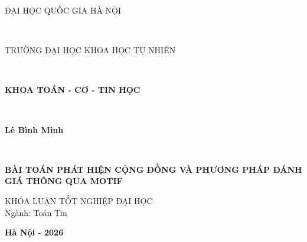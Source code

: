 
\thispagestyle{empty}
\thisfancypage{\fboxrule=8\fboxrule
	\fboxsep=2\fboxsep
\fbox}{}
\begin{center}
\begin{large}
{\fontsize{13pt}{1}\selectfont ĐẠI HỌC QUỐC GIA HÀ NỘI}
\end{large} \\
\begin{large}
{\fontsize{13pt}{1}\selectfont TRƯỜNG ĐẠI HỌC KHOA HỌC TỰ NHIÊN}
\end{large} \\
\begin{large}
{\fontsize{13pt}{1}\selectfont \textbf{KHOA TOÁN - CƠ - TIN HỌC}}
\end{large} \\
\vspace{3 cm}
\begin{large}
{\fontsize{14pt}{1}\selectfont \textbf{Lê Bình Minh}}
\end{large} \\
\end{center}

\vspace{3.5 cm}
\begin{center}
\fontsize{16pt}{1}\selectfont\textbf{BÀI TOÁN PHÁT HIỆN CỘNG ĐỒNG VÀ PHƯƠNG PHÁP ĐÁNH GIÁ THÔNG QUA MOTIF}
\vspace{4 cm}
\end{center}
\begin{center}
{\fontsize{14pt}{1}\selectfont KHÓA LUẬN TỐT NGHIỆP ĐẠI HỌC \\
Ngành: Toán Tin}
\end{center}
\vspace{6 cm}

\begin{center}
{\fontsize{14pt}{1}\selectfont \textbf{Hà Nội - 2026}}
\end{center}

\clearpage

